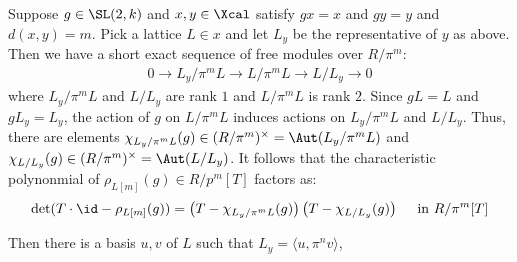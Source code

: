 Suppose $g \in \SL(2,k)$  and $x,y \in \Xcal$ satisfy $gx=x$ and $gy=y$ and $d(x,y)=m$. Pick a lattice $L \in x$ and let $L_y$ be the representative of $y$ as above. Then we have a short exact sequence of free modules over $R/\pi^m$:
\begin{align*}
    0 \to L_y/\pi^mL \to L/\pi^m L \to L/L_y \to 0
\end{align*}
where $L_y/\pi^mL$ and $ L/L_y$ are rank $1$ and $L/\pi^m L$ is rank $2$. Since $gL=L$ and $gL_y=L_y$, the action of $g$ on $L/\pi^m L$ induces actions on $L_y/\pi^m L$ and $L/L_y$. Thus, there are elements $\chi_{L_y/\pi^m L}(g) \in (R/\pi^m)^\times = \Aut(L_y/\pi^m L)$ and $\chi_{L/L_y}(g) \in (R/\pi^m)^\times = \Aut(L/L_y)$. It follows that the characteristic polynonmial of $\rho_{L[m]}(g) \in R/p^m [T]$ factors as:
\begin{align*}
    \det(T\cdot \id-\rho_{L[m]}(g)) =\left(T-\chi_{L_y/\pi^m L}(g)\right)\left(T-\chi_{L/L_y}(g)\right) \quad \text{ in $R/\pi^m [T]$}
\end{align*}





Then there is a basis $u,v$ of $L$ such that $L_y= \langle u , \pi^n v \rangle$,
